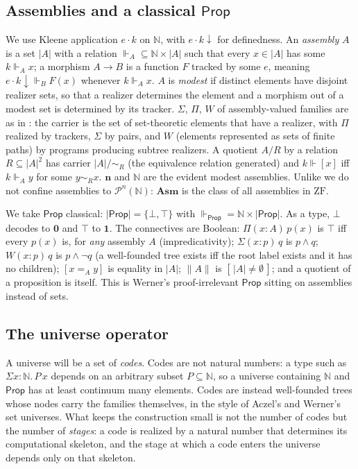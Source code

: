 \documentclass[10pt]{article}
\newcommand{\N}{\mathbb{N}}
\newcommand{\Asm}{\mathbf{Asm}}
\newcommand{\Prop}{\mathsf{Prop}}
\newcommand{\ZF}{\mathrm{ZF}}
\newcommand{\rz}{\Vdash}
\newcommand{\ap}{\cdot}
\newcommand{\PP}{\mathcal{P}}
\begin{document}
\subsection{Assemblies and a classical \texorpdfstring{$\Prop$}{Prop}}

We use Kleene application $e\ap k$ on $\N$, with $e\ap k{\downarrow}$ for
definedness. An \emph{assembly} $A$ is a set $|A|$ with a relation
${\rz_A}\subseteq\N\times|A|$ such that every $x\in|A|$ has some $k\rz_A x$;
a morphism $A\to B$ is a function $F$ tracked by some $e$, meaning
$e\ap k{\downarrow}\rz_B F(x)$ whenever $k\rz_A x$. $A$ is \emph{modest} if
distinct elements have disjoint realizer sets, so that a realizer determines
the element and a morphism out of a modest set is determined by its tracker.
$\Sigma$, $\Pi$, $W$ of
assembly-valued families are as in \cite[\S5.3]{vdbergotten23}: the carrier
is the set of set-theoretic elements that have a realizer, with $\Pi$
realized by trackers, $\Sigma$ by pairs, and $W$ (elements represented as
sets of finite paths) by programs producing subtree realizers. A quotient
$A/R$ by a relation $R\subseteq|A|^2$ has carrier $|A|/{\sim_R}$ (the
equivalence relation generated) and $k\rz[x]$ iff $k\rz_A y$ for some
$y\sim_R x$. $\mathbf n$ and $\N$ are the evident modest assemblies. Unlike \cite{vdbergotten23} we do not confine assemblies to
$\PP^n(\N)$: $\Asm$ is the class of all assemblies in $\ZF$.

We take $\Prop$ classical: $|\Prop|=\{\bot,\top\}$ with
$\rz_\Prop=\N\times|\Prop|$. As a type, $\bot$ decodes to $\mathbf 0$ and
$\top$ to $\mathbf 1$. The connectives are Boolean: $\Pi(x{:}A)\,p(x)$ is
$\top$ iff every $p(x)$ is, for \emph{any} assembly $A$ (impredicativity);
$\Sigma(x{:}p)\,q$ is $p\wedge q$; $W(x{:}p)\,q$ is $p\wedge\neg q$ (a
well-founded tree exists iff the root label exists and it has no children);
$[x=_A y]$ is equality in $|A|$; $\|A\|$ is $[\,|A|\ne\emptyset\,]$; and a
quotient of a proposition is itself. This is Werner's proof-irrelevant
$\Prop$ \cite{werner97,miquelwerner02} sitting on assemblies instead of
sets.

\subsection{The universe operator}

A universe will be a set of \emph{codes}. Codes are not natural numbers:
a type such as $\Sigma x{:}\N.\,P\,x$ depends on an arbitrary subset
$P\subseteq\N$, so a universe containing $\N$ and $\Prop$ has at least
continuum many elements. Codes are instead well-founded trees whose nodes
carry the families themselves, in the style of Aczel's and Werner's set
universes. What keeps the construction small is not the number of codes but
the number of \emph{stages}: a code is realized by a natural number that
determines its computational skeleton, and the stage at which a code enters
the universe depends only on that skeleton.
\end{document}
